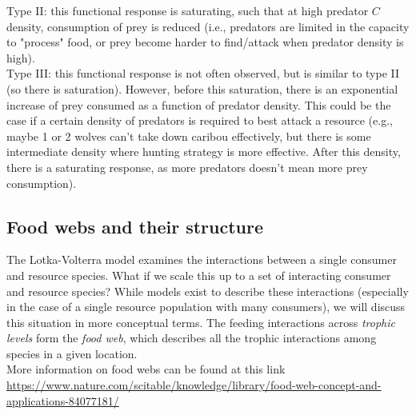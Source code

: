 \documentclass[12pt]{article}
\begin{document}
Type II: this functional response is saturating, such that at high predator $C$ density, consumption of prey is reduced (i.e., predators are limited in the capacity to "process" food, or prey become harder to find/attack when predator density is high). \\ 


Type III: this functional response is not often observed, but is similar to type II (so there is saturation). However, before this saturation, there is an exponential increase of prey consumed as a function of predator density. This could be the case if a certain density of predators is required to best attack a resource (e.g., maybe 1 or 2 wolves can't take down caribou effectively, but there is some intermediate density where hunting strategy is more effective. After this density, there is a saturating response, as more predators doesn't mean more prey consumption).

















\clearpage




\subsection*{Food webs and their structure}

The Lotka-Volterra model examines the interactions between a single consumer and resource species. What if we scale this up to a set of interacting consumer and resource species? While models exist to describe these interactions (especially in the case of a single resource population with many consumers), we will discuss this situation in more conceptual terms. The feeding interactions across \textit{trophic levels} form the \textit{food web}, which describes all the trophic interactions among species in a given location. \\



More information on food webs can be found at this link \\ \url{https://www.nature.com/scitable/knowledge/library/food-web-concept-and-applications-84077181/} \\
\end{document}
